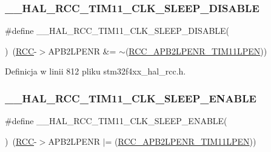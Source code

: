 \subsubsection{\texorpdfstring{\+\_\+\+\_\+\+H\+A\+L\+\_\+\+R\+C\+C\+\_\+\+T\+I\+M11\+\_\+\+C\+L\+K\+\_\+\+S\+L\+E\+E\+P\+\_\+\+D\+I\+S\+A\+B\+LE}{\_\_HAL\_RCC\_TIM11\_CLK\_SLEEP\_DISABLE}}
{\footnotesize\ttfamily \#define \+\_\+\+\_\+\+H\+A\+L\+\_\+\+R\+C\+C\+\_\+\+T\+I\+M11\+\_\+\+C\+L\+K\+\_\+\+S\+L\+E\+E\+P\+\_\+\+D\+I\+S\+A\+B\+LE(\begin{DoxyParamCaption}{ }\end{DoxyParamCaption})~(\hyperlink{group___peripheral__declaration_ga74944438a086975793d26ae48d5882d4}{R\+CC}-\/$>$A\+P\+B2\+L\+P\+E\+NR \&= $\sim$(\hyperlink{group___peripheral___registers___bits___definition_gad43fcaa4f4d6fb2b590a6ffee31f8c94}{R\+C\+C\+\_\+\+A\+P\+B2\+L\+P\+E\+N\+R\+\_\+\+T\+I\+M11\+L\+P\+EN}))}



Definicja w linii 812 pliku stm32f4xx\+\_\+hal\+\_\+rcc.\+h.

\mbox{\label{group___r_c_c___a_p_b2___low_power___enable___disable_ga2d808a429ceb72c79908770e79ff3cfa}} 
\subsubsection{\texorpdfstring{\+\_\+\+\_\+\+H\+A\+L\+\_\+\+R\+C\+C\+\_\+\+T\+I\+M11\+\_\+\+C\+L\+K\+\_\+\+S\+L\+E\+E\+P\+\_\+\+E\+N\+A\+B\+LE}{\_\_HAL\_RCC\_TIM11\_CLK\_SLEEP\_ENABLE}}
{\footnotesize\ttfamily \#define \+\_\+\+\_\+\+H\+A\+L\+\_\+\+R\+C\+C\+\_\+\+T\+I\+M11\+\_\+\+C\+L\+K\+\_\+\+S\+L\+E\+E\+P\+\_\+\+E\+N\+A\+B\+LE(\begin{DoxyParamCaption}{ }\end{DoxyParamCaption})~(\hyperlink{group___peripheral__declaration_ga74944438a086975793d26ae48d5882d4}{R\+CC}-\/$>$A\+P\+B2\+L\+P\+E\+NR $\vert$= (\hyperlink{group___peripheral___registers___bits___definition_gad43fcaa4f4d6fb2b590a6ffee31f8c94}{R\+C\+C\+\_\+\+A\+P\+B2\+L\+P\+E\+N\+R\+\_\+\+T\+I\+M11\+L\+P\+EN}))}



